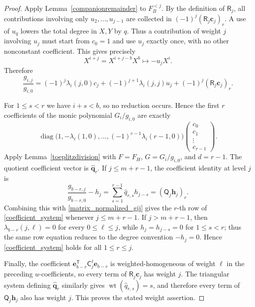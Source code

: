 \documentclass[12pt]{article}
\theoremstyle{remark}
\begin{document}
\begin{proof}
Apply Lemma~\ref{companionremainder} to $F_B^{<j}$.  By the definition
of $\mathsf R_j$, all contributions involving only
$u_2,\ldots,u_{j-1}$ are collected in
$(-1)^j(\mathsf R_j\mathbf c_j)_r$.  A use of $u_q$ lowers the total
degree in $X,Y$ by $q$.  Thus a contribution of weight $j$ involving
$u_j$ must start from $c_0=1$ and use $u_j$ exactly once, with no other
nonconstant coefficient.  This gives precisely
\[
 X^{i+j}=X^{i+j-b}X^b\longmapsto-u_jX^i.
\]
Therefore
\begin{equation}\label{matrix_normalized_gij}
 \frac{g_{i,j}}{g_{i,0}}
 =(-1)^j\lambda_i(j,0)c_j
  +(-1)^{j+1}\lambda_i(j,j)u_j
  +(-1)^j(\mathsf R_j\mathbf c_j)_r.
\end{equation}

For $1\le s<r$ we have $i+s<b$, so no reduction occurs.  Hence the
first $r$ coefficients of the monic polynomial $G_i/g_{i,0}$ are
exactly
\[
 \operatorname{diag}\!\bigl(
  1,-\lambda_i(1,0),\ldots,(-1)^{r-1}\lambda_i(r-1,0)
 \bigr)
 \begin{pmatrix}c_0\\c_1\\\vdots\\c_{r-1}\end{pmatrix}.
\]
Apply Lemma~\ref{toeplitzdivision} with $F=F_H$,
$G=G_i/g_{i,0}$, and $d=r-1$.  The quotient coefficient vector is
$\widehat{\mathbf q}_r$.  If $j\le m+r-1$, the coefficient identity at level $j$ is
\begin{equation*}
 \frac{g_{b-r,j}}{g_{b-r,0}}-h_j
 =\sum_{s=1}^{r-1}\widehat q_{r,s}h_{j-s}
 =(\mathsf Q_j\mathbf h_j)_r.
\end{equation*}
Combining this with \eqref{matrix_normalized_gij} gives the $r$-th row
of \eqref{coefficient_system} whenever $j\le m+r-1$.  If $j>m+r-1$, then
$\lambda_{b-r}(j,\ell)=0$ for every $0\le\ell\le j$, while
$h_j=h_{j-s}=0$ for $1\le s<r$; thus the same row equation reduces to
the degree convention $-h_j=0$.  Hence \eqref{coefficient_system}
holds for all $1\le r\le j$.

Finally, the coefficient
$\mathbf e_{b-r}^{\mathsf T}\mathsf C_j^\ell \mathbf e_{b-r}$ is
weighted-homogeneous of weight $\ell$ in the preceding $u$-coefficients,
so every term of $\mathsf R_j\mathbf c_j$ has weight $j$.
The triangular system defining $\widehat{\mathbf q}_r$ similarly gives
$\operatorname{wt}(\widehat q_{r,s})=s$, and therefore every term of
$\mathsf Q_j\mathbf h_j$ also has weight $j$.  This proves the stated
weight assertion.
\end{proof}
\end{document}
